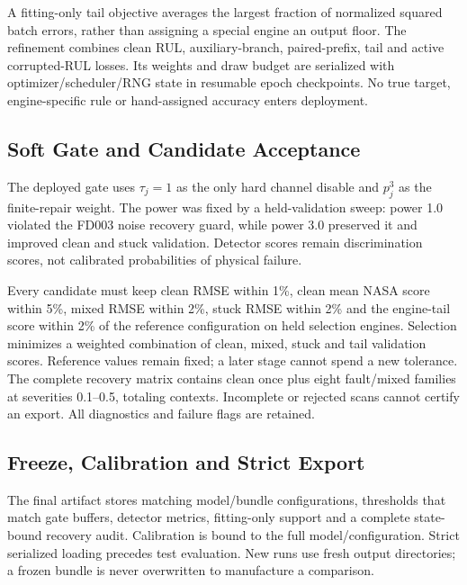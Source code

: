 \documentclass[conference]{IEEEtran}
\begin{document}
A fitting-only tail objective averages the largest fraction of normalized
squared batch errors, rather than assigning a special engine an output floor.
The refinement combines clean RUL, auxiliary-branch, paired-prefix, tail and
active corrupted-RUL losses. Its weights and draw budget are serialized with
optimizer/scheduler/RNG state in resumable epoch checkpoints. No true target,
engine-specific rule or hand-assigned accuracy enters deployment.

\subsection{\textbf{Soft Gate and Candidate Acceptance}}
The deployed gate uses $\tau_j=1$ as the only hard channel disable and
$p_j^3$ as the finite-repair weight. The power was fixed by a held-validation
sweep: power 1.0 violated the FD003 noise recovery guard, while power 3.0
preserved it and improved clean and stuck validation. Detector scores remain
discrimination scores, not calibrated probabilities of physical failure.

Every candidate must keep clean RMSE within 1\%, clean mean NASA score within
5\%, mixed RMSE within 2\%, stuck RMSE within 2\% and the engine-tail score
within 2\% of the reference configuration on held selection engines. Selection
minimizes a weighted combination of clean, mixed, stuck and tail validation
scores. Reference values remain fixed; a later stage cannot spend a new
tolerance. The complete recovery matrix contains clean once plus eight
fault/mixed families at severities 0.1--0.5, totaling
\CurrentRecoveryContexts{} contexts. Incomplete or rejected scans cannot certify
an export. All diagnostics and failure flags are retained.



\subsection{\textbf{Freeze, Calibration and Strict Export}}

The final artifact stores matching model/bundle configurations, thresholds that
match gate buffers, detector metrics, fitting-only support and a complete
state-bound recovery audit. Calibration is bound to the full model/configuration.
Strict serialized loading precedes test evaluation. New runs use fresh output
directories; a frozen bundle is never overwritten to manufacture a comparison.
\end{document}
